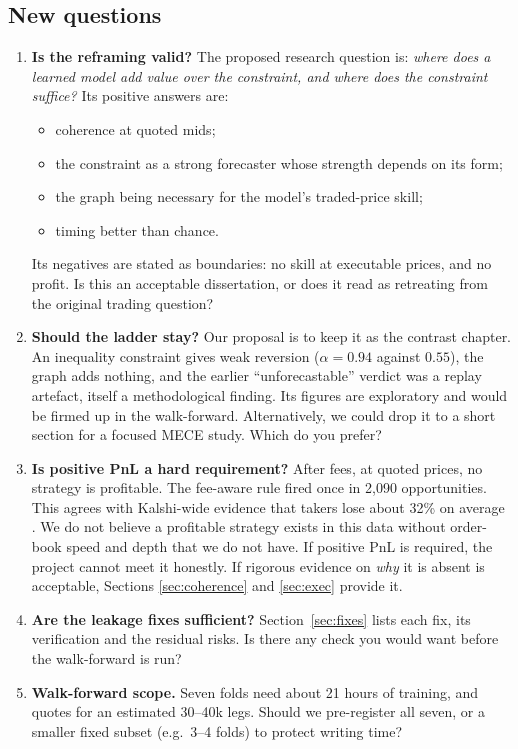 \documentclass[11pt,a4paper]{article}
\begin{document}
\subsection{New questions}
\begin{enumerate}[label=\textbf{\Alph*.}]
  \item \textbf{Is the reframing valid?} The proposed research question is:
    \emph{where does a learned model add value over the constraint, and where
    does the constraint suffice?} Its positive answers are:
    \begin{itemize}
      \item coherence at quoted mids;
      \item the constraint as a strong forecaster whose strength depends on its
        form;
      \item the graph being necessary for the model's traded-price skill;
      \item timing better than chance.
    \end{itemize}
    Its negatives are stated as boundaries: no skill at executable prices, and
    no profit. Is this an acceptable dissertation, or does it read as retreating
    from the original trading question?
  \item \textbf{Should the ladder stay?} Our proposal is to keep it as the
    contrast chapter. An inequality constraint gives weak reversion
    ($\alpha=0.94$ against $0.55$), the graph adds nothing, and the earlier
    ``unforecastable'' verdict was a replay artefact, itself a methodological
    finding. Its figures are exploratory and would be firmed up in the
    walk-forward. Alternatively, we could drop it to a short section for a
    focused MECE study. Which do you prefer?
  \item \textbf{Is positive PnL a hard requirement?} After fees, at quoted
    prices, no strategy is profitable. The fee-aware rule fired once in 2{,}090
    opportunities. This agrees with Kalshi-wide evidence that takers lose about
    32\% on average \cite{burgi2025}. We do not believe a profitable strategy
    exists in this data without order-book speed and depth that we do not have.
    If positive PnL is required, the project cannot meet it honestly. If
    rigorous evidence on \emph{why} it is absent is acceptable, Sections
    \ref{sec:coherence} and \ref{sec:exec} provide it.
  \item \textbf{Are the leakage fixes sufficient?} Section~\ref{sec:fixes} lists
    each fix, its verification and the residual risks. Is there any check you
    would want before the walk-forward is run?
  \item \textbf{Walk-forward scope.} Seven folds need about 21 hours of training,
    and quotes for an estimated 30--40k legs. Should we pre-register all seven, or a
    smaller fixed subset (e.g.\ 3--4 folds) to protect writing time?
\end{enumerate}
\end{document}
